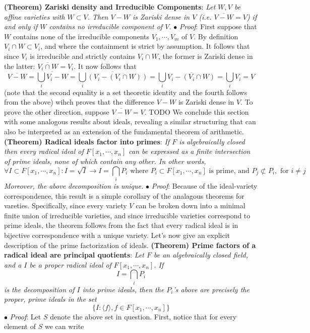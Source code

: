 \documentclass{article}
\newcommand*{\tb}{\textbf}
\newcommand*{\ti}{\textit}
\newcommand*{\n}{\newline}
\newcommand*{\nn}{\newline \newline}
\newcommand*{\Pf}{\indent \ensuremath{\bullet} \textit{Proof}: }
\newcommand*{\Fx}{\ensuremath{F[x_1, \cdots, x_n]}}
\begin{document}
\nn
\tb{(Theorem) Zariski density and Irreducible Components}: \ti{Let $ W, V $ be affine varieties with $ W \subset V $. Then $ V - W $ is Zariski dense in $ V $ (i.e. $ \overline{V - W} = V $) if and only if $ W $ contains no irreducible component of $ V $.}
\n
\Pf First suppose that $ W $ contains none of the irreducible components $ V_1, \cdots, V_m $ of $ V $. By definition $ V_i \cap W \subset V_i $, and where the containment is strict by assumption. It follows that since $ V_i $ is irreducible and strictly contains $ V_i \cap W $, the former is Zariski dense in the latter: $ \overline{V_i \cap W} = V_i $. It now follows that
$$ \overline{V - W} = \overline{\bigcup_i V_i - W} = \overline{\bigcup_i (V_i - (V_i \cap W))} = \bigcup_i \overline{V_i - (V_i \cap W)} = \bigcup_i V_i = V $$
(note that the second equality is a set theoretic identity and the fourth follows from the above) wihch proves that the difference $ V - W $ is Zariski dense in $ V $. To prove the other direction, suppose $ \overline{V - W} = V $. TODO \qedsymbol
\nn
We conclude this section with some analogous results about ideals, revealing a similar structuring that can also be interpreted as an extension of the fundamental theorem of arithmetic.
\nn
\tb{(Theorem) Radical ideals factor into primes}: \ti{If $ F $ is algebraically closed then every radical ideal of $ \Fx $ can be expressed as a finite intersection of prime ideals, none of which contain any other. In other words,}
$$ \forall I \subset \Fx: I = \sqrt{I} \rightarrow I = \bigcap_i P_i \text{ where } P_i \subset \Fx \text{ is prime, and } P_j \not\subset P_i, \text{ for } i \neq j $$
\indent \ti{Moreover, the above decomposition is unique.}
\n
\Pf Because of the ideal-variety correspondence, this result is a simple corollary of the analagous theorems for vareties. Specifically, since every variety $ V $ can be broken down into a minimal finite union of irreducible varieties, and since irreducible varieties correspond to prime ideals, the theorem follows from the fact that every radical ideal is in bijective correspondence with a unique variety. \qedsymbol
\nn
Let's now give an explicit description of the prime factorization of ideals.
\nn
\tb{(Theorem) Prime factors of a radical ideal are principal quotients}: \ti{Let $ F $ be an algebraically closed field, and a $ I $ be a proper radical ideal of $ \Fx $. If}
$$ I = \bigcap_i P_i $$
\indent \ti{is the decomposition of $ I $ into prime ideals, then the $ P_i $'s above are precisely the proper, prime ideals in the set}
$$ \{ I : \langle f \rangle, f \in \Fx \} $$
\Pf Let $ S $ denote the above set in question. First, notice that for every element of $ S $ we can write
\end{document}
